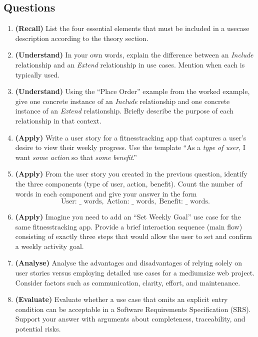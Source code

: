 \documentclass[12pt, a4paper]{article}
\begin{document}
\subsection*{Questions}
\begin{enumerate}
  \item \textbf{(Recall)} List the four essential elements that must be included in a usecase description according to the theory section. 
  \newpage
  \item \textbf{(Understand)} In your own words, explain the difference between an \emph{Include} relationship and an \emph{Extend} relationship in use cases. Mention when each is typically used. 
  \newpage
  \item \textbf{(Understand)} Using the ``Place Order'' example from the worked example, give one concrete instance of an \emph{Include} relationship and one concrete instance of an \emph{Extend} relationship. Briefly describe the purpose of each relationship in that context. 
  \newpage
  \item \textbf{(Apply)} Write a user story for a fitnesstracking app that captures a user's desire to view their weekly progress. Use the template ``As a \emph{type of user}, I want \emph{some action} so that \emph{some benefit}.''
  \newpage
  \item \textbf{(Apply)} From the user story you created in the previous question, identify the three components (type of user, action, benefit). Count the number of words in each component and give your answer in the form  
  \[
  \text{User: } \_ \text{ words},\; \text{Action: } \_ \text{ words},\; \text{Benefit: } \_ \text{ words}.
  \] 
  \newpage
  \item \textbf{(Apply)} Imagine you need to add an ``Set Weekly Goal'' use case for the same fitnesstracking app. Provide a brief interaction sequence (main flow) consisting of exactly three steps that would allow the user to set and confirm a weekly activity goal. 
  \newpage
  \item \textbf{(Analyse)} Analyse the advantages and disadvantages of relying solely on user stories versus employing detailed use cases for a mediumsize web project. Consider factors such as communication, clarity, effort, and maintenance. 
  \newpage
  \item \textbf{(Evaluate)} Evaluate whether a use case that omits an explicit entry condition can be acceptable in a Software Requirements Specification (SRS). Support your answer with arguments about completeness, traceability, and potential risks. 
  \newpage
\end{enumerate}
\end{document}
